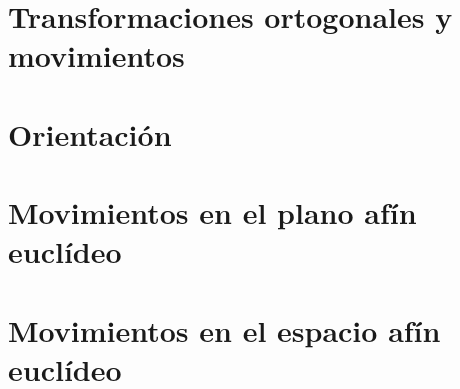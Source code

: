 \documentclass[0_algebra.tex]{subfiles}
\begin{document}
\begin{figure}[h]
	\centering
	
\end{figure}

\section{Transformaciones ortogonales y movimientos}

\begin{figure}[h]
	\centering
	
\end{figure}

\section{Orientación}

\begin{figure}[h]
	\centering
	
\end{figure}

\section{Movimientos en el plano afín euclídeo}

\begin{figure}[h]
	\centering
	
\end{figure}

\section{Movimientos en el espacio afín euclídeo}

\begin{figure}[h]
	\centering
	
\end{figure}
\end{document}
